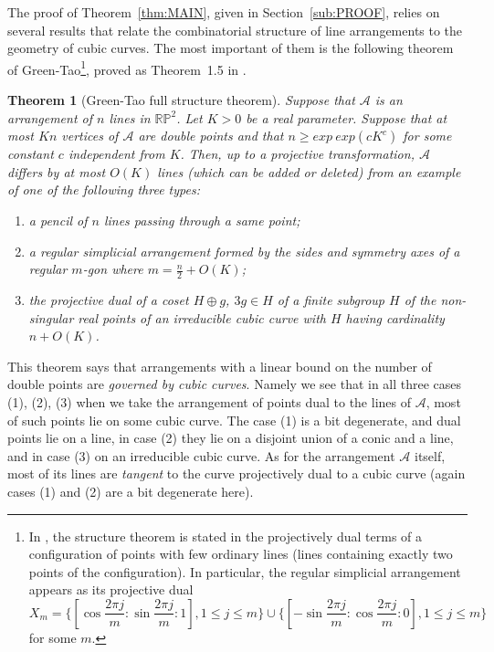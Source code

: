 \documentclass[a4paper,11pt,reqno]{amsart}
\newtheorem{thm}{Theorem}[section]
\theoremstyle{definition}
\theoremstyle{remark}
\theoremstyle{definition}
\theoremstyle{definition}
\theoremstyle{definition}
\numberwithin{equation}{section}
\begin{document}

The proof of Theorem~\ref{thm:MAIN}, given in Section~\ref{sub:PROOF}, relies on several results that relate the combinatorial structure of line arrangements to the geometry of cubic curves. The most important of them is the following theorem of Green-Tao\footnote{In \cite{GT}, the structure theorem is stated in the projectively dual terms of a configuration of points with few ordinary lines (lines containing exactly two points of the configuration). In particular, the regular simplicial arrangement appears as its projective dual 
$$X_{m} = \lbrace{ [\cos \frac{2\pi j}{m} : \sin \frac{2\pi j}{m} : 1], 1 \leq j \leq m \rbrace} \cup 
\lbrace{ [-\sin \frac{2\pi j}{m} : \cos \frac{2\pi j}{m} : 0], 1 \leq j \leq m \rbrace}
$$ for some $m$.}, proved as Theorem~1.5 in \cite{GT}.

\begin{thm}[Green-Tao full structure theorem]\label{thm:GT}
Suppose that $\mathcal{A}$ is an arrangement of $n$ lines in $\mathbb{RP}^{2}$. Let $K > 0$ be a real parameter. Suppose that at most $Kn$ vertices of $\mathcal{A}$ are double points and that $n \geq  exp~exp (cK^{c})$ for some constant $c$ independent from $K$. Then, up to a projective transformation, $\mathcal{A}$ differs by at most $O(K)$ lines (which can be added or deleted) from an example of one of the following three types:
\begin{enumerate}
    \item a pencil of $n$ lines passing through a same point;
    \item a regular simplicial arrangement formed by the sides and symmetry axes of a regular $m$-gon where $m=\frac{n}{2}+O(K)$;
    \item the projective dual of a coset $H \oplus g$, $3g \in H$ of a finite subgroup $H$ of the non-singular real points of an irreducible cubic curve with $H$ having cardinality $n+O(K)$.
\end{enumerate}
\end{thm}
This theorem says that arrangements with a linear bound on the number of double points are \emph{governed by cubic curves}. Namely we see that in all three cases (1), (2), (3) when we take the arrangement of points dual to the lines of $\mathcal A$, most of such points lie on some cubic curve. The case (1) is a bit degenerate, and dual points lie on a line, in case (2) they lie on a disjoint union of a conic and a line, and in case (3) on an irreducible cubic curve. As for the arrangement $\mathcal A$ itself, most of its lines are \emph{tangent} to the curve  projectively dual to a cubic curve (again cases (1) and (2) are a bit degenerate here).
\end{document}
